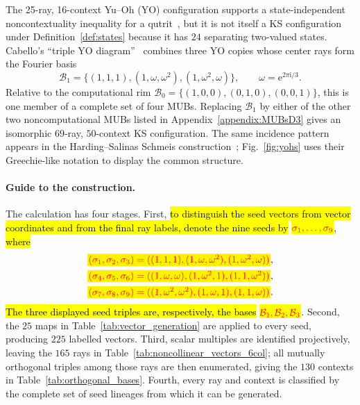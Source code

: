\documentclass[%
  reprint,
  superscriptaddress,
  showpacs,
  showkeys,
  amsmath,amssymb,
  pra,
  longbibliography,
  floatfix,
  x11names
]{revtex4-2}
\newcommand{\ii}{\mathrm{i}}
\newenvironment{revision}{\begingroup\color{revisionblue}}{\endgroup}
\newcommand{\corr}[1]{{\color{red}\hl{#1}}}
\newcommand{\corrmath}[1]{\begingroup\setlength{\fboxsep}{1pt}\colorbox{yellow}{\ensuremath{\color{red}#1}}\endgroup}
\begin{document}
\begin{revision}
The 25-ray, 16-context Yu--Oh (YO) configuration supports a state-independent noncontextuality inequality for a qutrit~\cite{PhysRevLett.103.050401,Yu-2012,Yu2015}, but it is not itself a KS configuration under Definition~\ref{def:states} because it has $24$ separating two-valued states.  Cabello's ``triple YO diagram''~\cite{Cabello2025} combines three YO copies whose center rays form the Fourier basis
\[
\mathcal{B}_1=\{(1,1,1),(1,\omega,\omega^2),(1,\omega^2,\omega)\},
\qquad \omega=\mathrm{e}^{2\pi\ii{}/3}.
\]
Relative to the computational rim $\mathcal{B}_0=\{(1,0,0),(0,1,0),(0,0,1)\}$, this is one member of a complete set of four MUBs.  Replacing $\mathcal{B}_1$ by either of the other two noncomputational MUBs listed in Appendix~\ref{appendix:MUBsD3} gives an isomorphic $69$-ray, $50$-context KS configuration.  The same incidence pattern appears in the Harding--Salinas Schmeis construction~\cite[Fig.~2 and Theorem~2.6]{harding2025remarksIJTP}; Fig.~\ref{fig:yohs} uses their Greechie-like notation to display the common structure.

\paragraph*{Guide to the construction.}
The calculation has four stages.  First, \corr{to distinguish the seed vectors from
vector coordinates and from the final ray labels, denote the nine seeds by}
\corrmath{\sigma_1,\ldots,\sigma_9}, \corr{where}
\[
\begin{aligned}
&\corrmath{(\sigma_1,\sigma_2,\sigma_3)=((1,1,1),(1,\omega,\omega^2),(1,\omega^2,\omega))},\\
&\corrmath{(\sigma_4,\sigma_5,\sigma_6)=((1,\omega,\omega),(1,\omega^2,1),(1,1,\omega^2))},\\
&\corrmath{(\sigma_7,\sigma_8,\sigma_9)=((1,\omega^2,\omega^2),(1,\omega,1),(1,1,\omega))}.
\end{aligned}
\]
\corr{The three displayed seed triples are, respectively, the bases}
\corrmath{\mathcal{B}_1,\mathcal{B}_2,\mathcal{B}_3}.
Second, the $25$ maps in Table~\ref{tab:vector_generation} are applied to every seed, producing $225$ labelled vectors.  Third, scalar multiples are identified projectively, leaving the $165$ rays in Table~\ref{tab:noncollinear_vectors_6col}; all mutually orthogonal triples among those rays are then enumerated, giving the $130$ contexts in Table~\ref{tab:orthogonal_bases}.  Fourth, every ray and context is classified by the complete set of seed lineages from which it can be generated.


\end{revision}
\end{document}
